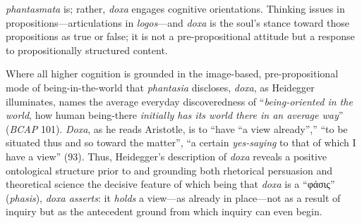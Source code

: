 \documentclass{article}
\newcommand{\gk}[1]{{\greekfont #1}}
\begin{document}
\textit{phantasmata} is; rather, \textit{doxa} engages cognitive orientations. Thinking issues in propositions---articulations in \textit{logos}---and \textit{doxa} is the soul's stance toward those propositions as true or false; it is not a pre-propositional attitude but a response to propositionally structured content.

Where all higher cognition is grounded in the image-based, pre-propositional mode of being-in-the-world that \textit{phantasia} discloses, \textit{doxa}, as Heidegger illuminates, names the average everyday discoveredness of ``\textit{being-oriented in the world}, how human being-there \textit{initially has its world there in an average way}'' (\textit{BCAP} 101). \textit{Doxa}, as he reads Aristotle, is to ``have ``a view already'','' ``to be situated thus and so toward the matter'', ``a certain \textit{yes-saying} to that of which I have a view'' (93). Thus, Heidegger's description of \textit{doxa} reveals a positive ontological structure prior to and grounding both rhetorical persuasion and theoretical science the decisive feature of which being that \textit{doxa} is a ``\gk{φάσις}'' (\textit{phasis}), \textit{doxa asserts}: it \textit{holds} a view---as already in place---not as a result of inquiry but as the antecedent ground from which inquiry can even begin. 
\end{document}
